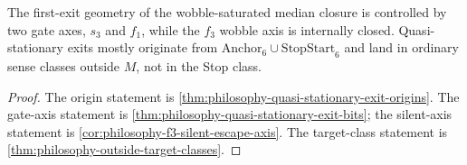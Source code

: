 \begin{theorem}
\label{thm:philosophy-first-exit-channel-geometry}
The first-exit geometry of the wobble-saturated median closure is
controlled by two gate axes, $s_{3}$ and $f_{1}$, while the $f_{3}$
wobble axis is internally closed. Quasi-stationary exits mostly originate
from $\mathrm{Anchor}_{6}\cup\mathrm{StopStart}_{6}$ and land in ordinary
sense classes outside $M$, not in the Stop class.
\end{theorem}
\begin{proof}
The origin statement is
\autoref{thm:philosophy-quasi-stationary-exit-origins}. The gate-axis
statement is \autoref{thm:philosophy-quasi-stationary-exit-bits}; the
silent-axis statement is
\autoref{cor:philosophy-f3-silent-escape-axis}. The target-class
statement is \autoref{thm:philosophy-outside-target-classes}.
\end{proof}

